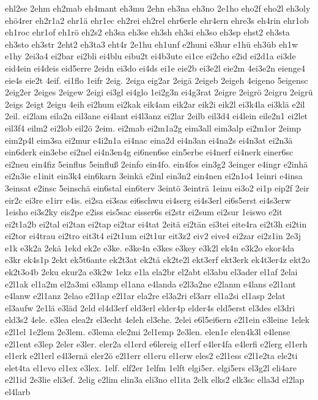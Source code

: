 {ehl2se
2ehm
eh2mab
eh4mant
eh3mu
2ehn
eh3na
eh3no
2e1ho
eho2f
eho2l
eh3oly
ehö4rer
eh2r1a2
ehr1ä
ehr1ec
eh2rei
eh2rel
ehr6erle
ehr4ern
ehre3s
eh4rin
ehr1ob
eh1roc
ehr1of
eh1rö
eh2s2
eh3sa
eh3se
eh3sh
eh3si
eh3so
eh3sp
ehst2
eh3sta
eh3sto
eh3str
2eht2
eh3ta3
eht4r
2e1hu
eh1unf
e2huni
e3hur
e1hü
eh3üb
eh1w
e1hy
2ei3a4
ei2bar
ei2bli
ei4blu
eibu2t
ei4b3ute
ei1ce
ei2cho
e2id
ei2d1a
ei3de
eid4ein
ei4deis
eid5erre
2eidn
ei3do
ei4ds
ei1e
eie2b
ei3e2l
eie2m
4ei3e2n
eienge4
eie4s
eie2t
4eif.
ei1flo
1eifr
2eig.
2eiga
eig2ar
2eigä
2eigeb
2eigeh
4eigeno
5eigensc
2eig2er
2eiges
2eigew
2eigi
ei3gl
ei4glo
1ei2g3n
ei4g3rat
2eigre
2eigrö
2eigru
2eigrü
2eigs
2eigt
2eigu
4eih
ei2hum
ei2kak
eik4am
eik2ar
eik2i
eik2l
ei3k4la
ei3klä
e2il
2eil.
ei2lam
eila2n
eil3ane
ei4lant
ei4l3anz
ei2lar
2eilb
eil3d4
ei4lein
eile2n1
ei2let
eil3f4
eilm2
ei2lob
eil2ö
2eim.
ei2mab
ei2m1a2g
eim3all
eim3alp
ei2m1or
2eimp
eim2p4l
eim3sa
ei2mur
e4i2n1a
ei4nac
eina2d
ei4n3an
ei4na2s
ei4n3at
ei2n3ä
ein6derk
ein3ebe
ei2nel
ei4n3en4g
ei6nen6se
ein5erbe
ei4nerf
ei4nerk
einer6sc
ei2neu
ein4fiz
5einflus
5einfluß
2einfo
ein4fo.
ein4fos
ein3g2
3einger
e4ingr
e2inhä
ei2n3ie
e1init
ein3k4
ein6karn
3einkä
e2inl
ein3n2
ein4nen
ei2n1o4
1einri
e4insa
3einsat
e2insc
5einschä
ein6stal
ein6terv
3eintö
3einträ
1einu
ei3o2
ei1p
eip2f
2eir
eir2c
ei3re
e1irr
e4is.
ei2sa
ei3sas
ei6schwu
ei4serg
ei4s3erl
ei6s5erst
ei4s3erw
1eisho
ei3s2ky
eis2pe
e2iss
eis5sac
eisser6s
ei2str
ei2sum
ei2sur
1eiswo
e2it
ei2t1a2b
ei2tal
ei2tan
ei2tap
ei2tar
ei4tat
2eitä
ei2tän
ei3tei
eite4ra
ei2t3h
ei2tin
ei2tor
ei4trau
ei2tro
eit3t4
ei2t1um
ei2t1ur
eit3z2
eiv2
eive4
ei2zar
ei2z1in
2e3j
e1k
e3k2a
2ekä
1ekd
ek2e
e3ke.
e3ke4n
e3kes
e3key
e3k2l
ek4n
e3k2o
ekor4da
e3kr
ek4s1p
2ekt
ek5t6ante
ek2t3at
ek2tä
ek2te2l
ekt3erf
ekt3erk
ek4t3er4z
ekt2o
ek2t3o4b
2eku
ekur2a
e3k2w
1ekz
e1la
ela2br
el2abt
el3abu
el3ader
el1af
2elai
e2l1ak
el1a2m
el2a3mi
e3lamp
el1ana
e4landa
e2l3a2ne
e2lanm
e4lans
e2l1ant
e4lanw
e2l1anz
2elao
e2l1ap
e2l1ar
ela2re
el3a2ri
el3arr
el1a2si
el1asp
2elat
el3aufw
2e1lä
e3läd
2eld
el4d3erf
eld3erl
elder4p
elder4s
eld5erst
el3des
el3dri
eld3s2
4ele.
e3lea
elea2r
el3echt
4eleh
el3ehe.
2elei
e6l5ei6ern
e2l1ein
e3leine
1elek
e2l1el
1e2lem
2e3lem.
e3lema
ele2mi
2el1emp
2e3len.
elen1e
elen4k3l
e4lense
e2l1ent
e3lep
2eler
e3ler.
eler2a
el1erd
e6lereig
el1erf
e4ler4fa
e4lerfi
e2lerg
el1erh
el1erk
e2l1erl
e4l3ernä
eler2ö
e2l1err
el1eru
el1erw
eles2
e2l1ess
e2l1e2ta
ele2ti
elet4ta
el1evo
el1ex
e3lex.
1elf.
elf2er
1elfm
1elft
elgi5er.
elgi5ers
el3g2l
eli4are
e2l1id
2e3lie
eli3ef.
2elig
e2lim
elin3a
eli3no
el1ita
2elk
elks2
elk3sc
ella3d
el2lap
el4larb
}
